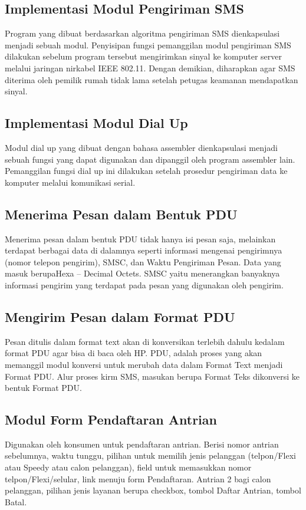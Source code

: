 \documentclass[12pt,a4paper]{article}
\begin{document}
\subsection{Implementasi Modul Pengiriman SMS}
Program yang dibuat berdasarkan algoritma pengiriman SMS dienkapsulasi menjadi sebuah modul. Penyisipan fungsi pemanggilan modul pengiriman SMS dilakukan sebelum program tersebut mengirimkan sinyal ke komputer server melalui jaringan nirkabel IEEE 802.11. Dengan demikian, diharapkan agar SMS diterima oleh pemilik rumah tidak lama setelah petugas keamanan mendapatkan sinyal. 
\subsection{Implementasi Modul Dial Up}
Modul dial up yang dibuat dengan bahasa assembler dienkapsulasi menjadi sebuah fungsi yang dapat digunakan dan dipanggil oleh program assembler lain. Pemanggilan fungsi dial up ini dilakukan setelah prosedur pengiriman data ke komputer melalui komunikasi serial.
\subsection{Menerima Pesan dalam Bentuk PDU}
Menerima pesan dalam bentuk PDU tidak hanya isi pesan saja, melainkan terdapat berbagai data di dalamnya seperti informasi mengenai pengirimnya (nomor telepon pengirim), SMSC, dan Waktu Pengiriman Pesan. Data yang masuk berupaHexa – Decimal Octets. SMSC yaitu menerangkan banyaknya informasi pengirim yang terdapat pada pesan yang digunakan oleh pengirim.
\subsection{Mengirim Pesan dalam Format PDU}
Pesan ditulis dalam format text akan di konversikan terlebih dahulu kedalam format PDU agar bisa di baca oleh HP. PDU, adalah proses yang akan memanggil modul konversi untuk merubah data dalam Format Text menjadi Format PDU.  Alur proses kirm SMS, masukan berupa Format Teks dikonversi ke bentuk Format PDU.
\subsection{Modul Form Pendaftaran Antrian}
Digunakan oleh konsumen untuk pendaftaran antrian. Berisi nomor antrian sebelumnya, waktu tunggu, pilihan untuk memilih jenis pelanggan (telpon/Flexi atau Speedy atau calon pelanggan), field untuk memasukkan nomor telpon/Flexi/selular, link menuju form Pendaftaran. Antrian 2 bagi calon pelanggan, pilihan jenis layanan berupa checkbox, tombol Daftar Antrian, tombol Batal.
\end{document}
